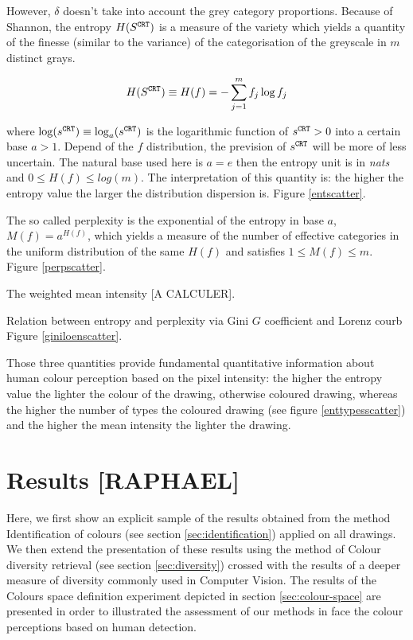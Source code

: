 \documentclass[11pt,a4paper]{article}
\begin{document}
However, \(\delta\) doesn't take into account the grey category
proportions. Because of Shannon, the entropy
\(H(S^{\tt \scriptstyle CRT})\) is a measure of the variety which yields
a quantity of the finesse (similar to the variance) of the
categorisation of the greyscale in \(m\) distinct grays.

\[ H(S^{\tt \scriptstyle CRT}) \equiv H(f) = -\sum_{j=1}^{m} f_j \log f_j \]

where
\(\log(s^{\tt \scriptstyle CRT}) \equiv \log_a(s^{\tt \scriptstyle CRT})\)
is the logarithmic function of \(s^{\tt \scriptstyle CRT} > 0\) into a
certain base \(a > 1\). Depend of the \(f\) distribution, the prevision
of \(s^{\tt \scriptstyle CRT}\) will be more of less uncertain. The
natural base used here is \(a = e\) then the entropy unit is in
\emph{nats} and \(0 \leq H(f) \leq log(m)\). The interpretation of this
quantity is: the higher the entropy value the larger the distribution
dispersion is. Figure \ref{entscatter}.

The so called perplexity is the exponential of the entropy in base
\(a\), \(M(f) = a^{H(f)}\), which yields a measure of the number of
effective categories in the uniform distribution of the same \(H(f)\)
and satisfies \(1 \leq M(f) \leq m\). Figure \ref{perpscatter}.

The weighted mean intensity {[}A CALCULER{]}.

Relation between entropy and perplexity via Gini \(G\) coefficient and
Lorenz courb Figure \ref{giniloenscatter}.

Those three quantities provide fundamental quantitative information
about human colour perception based on the pixel intensity: the higher
the entropy value the lighter the colour of the drawing, otherwise
coloured drawing, whereas the higher the number of types the coloured
drawing (see figure \ref{enttypesscatter}) and the higher the mean
intensity the lighter the drawing.



\section{Results [RAPHAEL]}

Here, we first show an explicit sample of the results obtained from the method Identification of colours (see section \ref{sec:identification}) applied on all drawings. We then extend the presentation of these results using the method of Colour diversity retrieval (see section \ref{sec:diversity}) crossed with the results of a deeper measure of diversity commonly used in Computer Vision. The results of the Colours space definition experiment depicted in section  \ref{sec:colour-space} are presented in order to illustrated the assessment of our methods in face the colour perceptions based on human detection.
\end{document}
